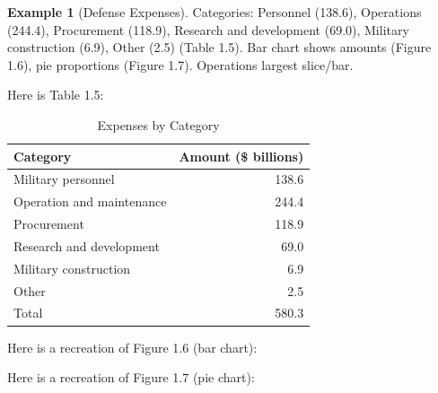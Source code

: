 \documentclass{article}
\theoremstyle{definition}
\newtheorem{example}{Example}
\begin{document}
	\begin{example}[Defense Expenses]
		Categories: Personnel (138.6), Operations (244.4), Procurement (118.9), Research and development (69.0), Military construction (6.9), Other (2.5) (Table 1.5). Bar chart shows amounts (Figure 1.6), pie proportions (Figure 1.7). Operations largest slice/bar.
		
		Here is Table 1.5:
		
		\begin{table}[ht]
			\centering
			\begin{tabular}{lr}
				\toprule
				Category & Amount (\$ billions) \\
				\midrule
				Military personnel & 138.6 \\
				Operation and maintenance & 244.4 \\
				Procurement & 118.9 \\
				Research and development & 69.0 \\
				Military construction & 6.9 \\
				Other & 2.5 \\
				Total & 580.3 \\
				\bottomrule
			\end{tabular}
			\caption{Expenses by Category}
		\end{table}
		
		Here is a recreation of Figure 1.6 (bar chart):
		
		
		Here is a recreation of Figure 1.7 (pie chart):
		
\end{example}
\end{document}
